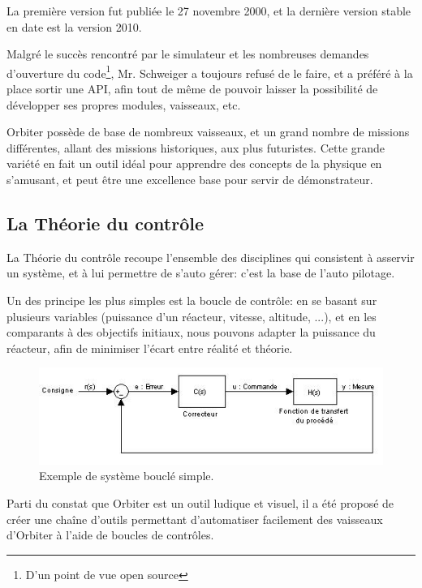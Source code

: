 \documentclass[a4paper,11pt]{article}
\begin{document}
        La première version fut publiée le 27 novembre 2000, et la dernière version stable en date est la version 2010.

        Malgré le succès rencontré par le simulateur et les nombreuses demandes d'ouverture du code\footnote{D'un point de vue open source}, Mr. Schweiger a toujours refusé de le faire, et a préféré à la place sortir une API, afin tout de même de pouvoir laisser la possibilité de développer ses propres modules, vaisseaux, etc.

        Orbiter possède de base de nombreux vaisseaux, et un grand nombre de missions différentes, allant des missions historiques, aux plus futuristes. Cette grande variété en fait un outil idéal pour apprendre des concepts de la physique en s'amusant, et peut être une excellence base pour servir de démonstrateur.

    \subsection{La Théorie du contrôle}
        La Théorie du contrôle recoupe l'ensemble des disciplines qui consistent à asservir un système, et à lui permettre de s'auto gérer: c'est la base de l’auto pilotage.

        Un des principe les plus simples est la boucle de contrôle: en se basant sur plusieurs variables (puissance d'un réacteur, vitesse, altitude, ...), et en les comparants à des objectifs initiaux, nous pouvons adapter la puissance du réacteur, afin de minimiser l'écart entre réalité et théorie.

        \begin{figure}[!h]
            \begin{center}
                \includegraphics[width=1\textwidth]{img/boucle_controle.jpg}
                \caption{Exemple de système bouclé simple.}
            \end{center}
        \end{figure}

        Parti du constat que Orbiter est un outil ludique et visuel, il a été proposé de créer une chaîne d'outils permettant d'automatiser facilement des vaisseaux d'Orbiter à l'aide de boucles de contrôles.
\end{document}

